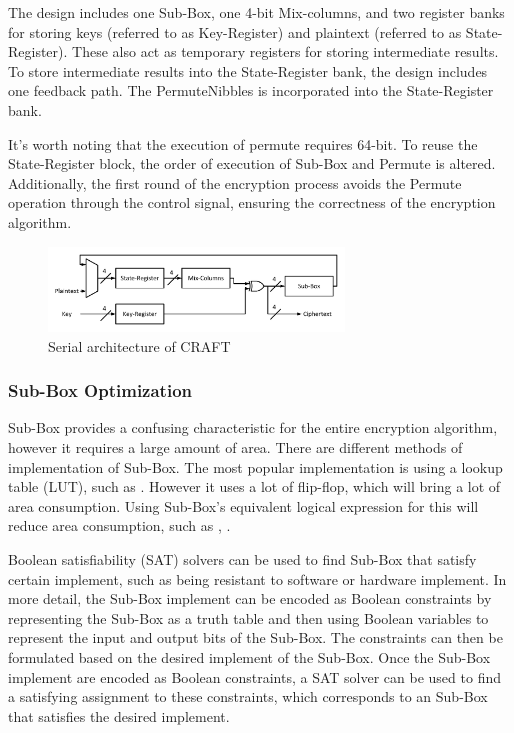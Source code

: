 \documentclass[final,5p,times,twocolumn]{elsarticle}
\begin{document}
The design includes one Sub-Box, one 4-bit Mix-columns, and two register banks for storing keys (referred to as Key-Register) and plaintext (referred to as State-Register). These also act as temporary registers for storing intermediate results. To store intermediate results into the State-Register bank, the design includes one feedback path. The PermuteNibbles is incorporated into the State-Register bank.

It's worth noting that the execution of permute requires 64-bit. To reuse the State-Register block, the order of execution of Sub-Box and Permute is altered. Additionally, the first round of the encryption process avoids the Permute operation through the control signal, ensuring the correctness of the encryption algorithm.

\begin{figure}[h]%
    \centering
    \includegraphics[width=0.7\textwidth]{./fig/serial-archticture.pdf}
    \caption{Serial architecture of CRAFT}\label{fig3}
\end{figure}


\subsubsection{Sub-Box Optimization }\label{subsubsec1}


Sub-Box provides a confusing characteristic for the entire encryption algorithm, however it requires a large amount of area.
There are different methods of implementation of Sub-Box.
The most popular implementation is using a lookup table (LUT), such as \cite{DBLP:journals/tcas/Lara-NinoDM17}.
However it uses a lot of flip-flop, which will bring a lot of area consumption.
Using Sub-Box's equivalent logical expression for this will reduce area consumption, such as \cite{bao2019peigen}, \cite{bib16}.

Boolean satisfiability (SAT) solvers can be used to find Sub-Box that satisfy certain implement, such as being resistant to software or hardware implement.
In more detail, the Sub-Box implement can be encoded as Boolean constraints by representing the Sub-Box as a truth table and then using Boolean variables to represent the input and output bits of the Sub-Box.
The constraints can then be formulated based on the desired implement of the Sub-Box.
Once the Sub-Box implement are encoded as Boolean constraints, a SAT solver can be used to find a satisfying assignment to these constraints, which corresponds to an Sub-Box that satisfies the desired implement.
\end{document}
